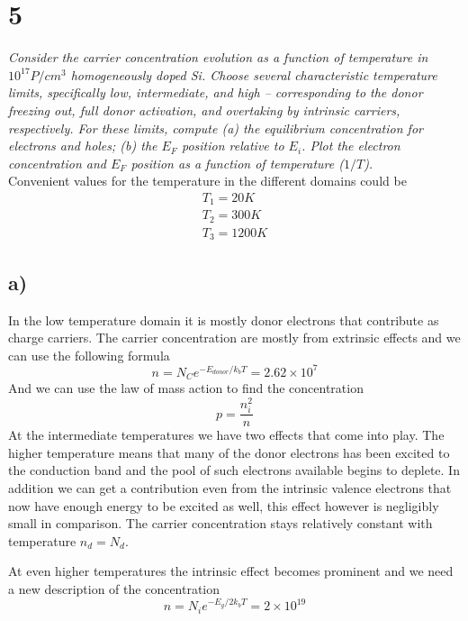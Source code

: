 \documentclass{article}
\begin{document}
\newpage
\section*{5}

\emph{Consider the carrier concentration evolution as a function of temperature in $10^17P/cm^3$ homogeneously doped Si. Choose several characteristic temperature limits, specifically low, intermediate, and high – corresponding to the donor freezing out, full donor activation, and overtaking by intrinsic carriers, respectively. For these limits, compute (a) the equilibrium concentration for electrons and holes;
(b) the $E_F$ position relative to $E_i$.
Plot the electron concentration and $E_F$ position as a function of temperature ($1/T$).}\\

Convenient values for the temperature in the different domains could be
\begin{align*}
	T_1 = 20K\\
	T_2 = 300K\\
	T_3 = 1200K
\end{align*}

\subsection*{a)}

In the low temperature domain it is mostly donor electrons that contribute as charge carriers. The carrier concentration are mostly from extrinsic effects and we can use the following formula
\begin{equation}
	n = N_Ce^{-E_{donor}/k_bT}=2.62\times10^7
\end{equation}
And we can use the law of mass action to find the concentration
\begin{equation*}
	p = \frac{n_i^2}{n}
\end{equation*}
At the intermediate temperatures we have two effects that come into play. The higher temperature means that many of the donor electrons has been excited to the conduction band and the pool of such electrons available begins to deplete. In addition we can get a contribution even from the intrinsic valence electrons that now have enough energy to be excited as well, this effect however is negligibly small in comparison.
The carrier concentration stays relatively constant with temperature $n_d=N_d$.

At even higher temperatures the intrinsic effect becomes prominent and we need a new description of the concentration
\begin{equation*}
	n = N_ie^{-E_g/2k_bT} = 2\times 10^{19}
\end{equation*}
\end{document}
